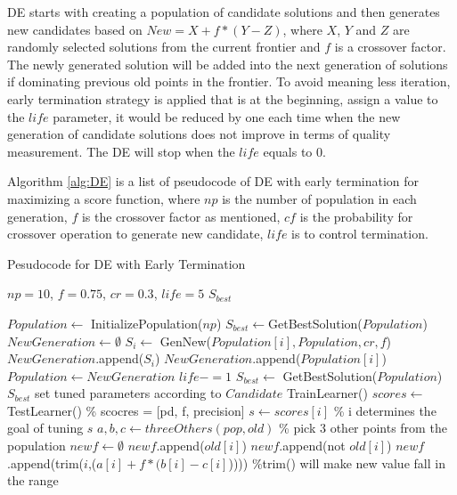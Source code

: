\documentclass{sig-alternative}
\begin{document}
DE starts with creating a population of candidate solutions and then generates new 
candidates based on $New = X+f*(Y-Z)$, where $X$, $Y$ and $Z$ are randomly selected 
solutions from the current frontier and $f$ is a crossover factor. The newly generated solution 
will be added into the next generation of solutions if dominating previous old points in the 
frontier. To avoid meaning less iteration, early termination strategy is applied that is at the 
beginning, assign a value to the $life$ parameter, it would be reduced by one each time   
when the new generation of candidate solutions does not improve in terms of quality 
measurement. The DE will stop when the $life$ equals to 0.

Algorithm \ref{alg:DE} is a list of pseudocode of DE with early termination for maximizing a 
score function, where $np$ is the number of population in each generation, $f$ is the 
crossover factor as mentioned, $cf$ is the probability for crossover operation to generate new 
candidate, $life$ is to control termination.

\begin{algorithm}
	\caption{Pesudocode for DE with Early Termination}
	\label{alg:DE}
		\begin{algorithmic}[1]
			\Require $np = 10$, $f=0.75$, $cr=0.3$, $life = 5$
			\Ensure $S_{best}$
	      
		  \State $Population  \gets $ InitializePopulation($np$)
		  \State $S_{best} \gets $GetBestSolution($Population $)
			\State $NewGeneration \gets \emptyset$
				\State $S_i \gets$ GenNew($Population [i], Population , cr, f$)
				 	\State $NewGeneration$.append($S_i$)
				\Else
					\State $NewGeneration$.append($Population [i]$)
				\EndIf
			\EndFor
			\State $Population  \gets NewGeneration$
				\State $life -=1$
			\EndIf
			\State $S_{best} \gets$ GetBestSolution($Population $)
		  \EndWhile
		 \State \Return $S_{best}$
		 \EndFunction
		    \State set tuned parameters according to $Candidate$
		    \State TrainLearner()
		    \State $scores \gets$TestLearner()
		    \State \% scocres = [pd, f, precision]
		    \State $s \gets scores[i] $ 
		    \State \% i determines the goal of tuning
		    \State \Return$s$
		 \EndFunction
		   \State $a, b, c\gets threeOthers(pop,old)$ 
		   \State \% pick 3 other points from the population
		   \State $newf \gets \emptyset$
		          \State $newf$.append($old[i]$)
                \Else
                    \State $newf$.append(not $old[i]$)
		          \Else
		           \State $newf$.append(trim($i$,($a[i] + f * (b[i] - c[i]$))))
		           \State \%trim() will make new value fall in the range
		          \EndIf
		        \EndIf
		   \EndFor
		 \EndFunction
        \end{algorithmic}            
\end{algorithm}
\end{document}
